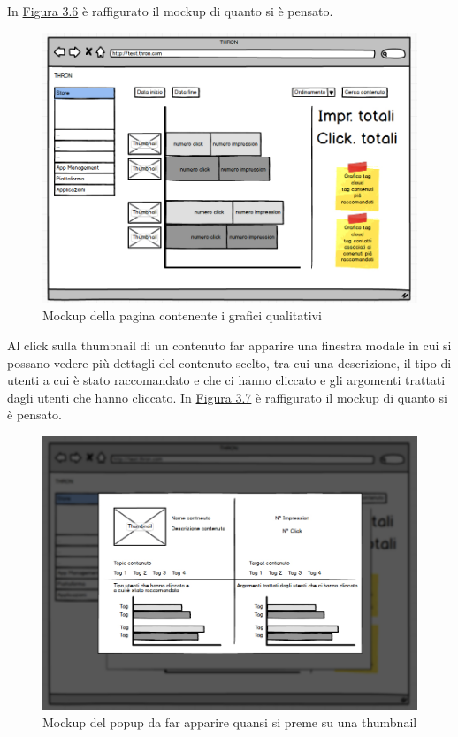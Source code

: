 \documentclass[a4paper, 12pt, twoside, openright]{book}
\begin{document}
In \hyperref[grafico-qualitativo-1-mockup]{Figura 3.6} è raffigurato il mockup di quanto si è pensato.
\begin{figure}[H]
	\centering
	\label{grafico-qualitativo-1-mockup}	\includegraphics[width=1.0\textwidth]{images/grafico-qualitativo-1-mockup.jpg}
	\caption{Mockup della pagina contenente i grafici qualitativi}
\end{figure} 
Al click sulla thumbnail di un contenuto far apparire una finestra modale in cui si possano vedere più dettagli del contenuto scelto, tra cui una descrizione, il tipo di utenti a cui è stato raccomandato e che ci hanno cliccato e gli argomenti trattati dagli utenti che hanno cliccato.
In \hyperref[grafico-qualitativo-2-mockup]{Figura 3.7} è raffigurato il mockup di quanto si è pensato.
\begin{figure}[H]
	\centering
	\label{grafico-qualitativo-2-mockup}	\includegraphics[width=1.0\textwidth]{images/grafico-qualitativo-2-mockup.jpg}
	\caption{Mockup del popup da far apparire quansi si preme su una thumbnail}
\end{figure} 
\end{document}
